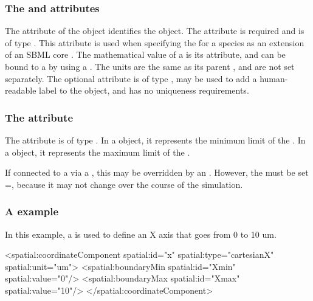 \subsubsection{The \fixttspace{} and \fixttspace{} attributes}
The  attribute of the \Boundary object identifies the object.  The attribute is required and is of type . This attribute is used when specifying the \BoundaryCondition for a species as an extension of an SBML core \Parameter.  The mathematical value of a \Boundary is its  attribute, and can be bound to a \Parameter by using a \SpatialSymbolReference {}.  The units are the same as its parent \CoordinateComponent, and are not set separately.  The optional  attribute is of type , may be used to add a human-readable label to the object, and has no uniqueness requirements.

\subsubsection{The \fixttspace{} attribute}
The  attribute is of type . In a  object, it represents the minimum limit of the \CoordinateComponent.  In a  object, it represents the maximum limit of the \CoordinateComponent.


If connected to a \Parameter via a \SpatialSymbolReference, this  may be overridden by an \InitialAssignment.  However, the \Parameter must be set =, because it may not change over the course of the simulation.


\subsubsection{A \CoordinateComponent example}
In this example, a \CoordinateComponent is used to define an X axis that goes from 0 to 10 um.

\begin{example}
  <spatial:coordinateComponent spatial:id="x" spatial:type="cartesianX" spatial:unit="um">
    <spatial:boundaryMin spatial:id="Xmin" spatial:value="0"/>
    <spatial:boundaryMax spatial:id="Xmax" spatial:value="10"/>
  </spatial:coordinateComponent>
\end{example}


